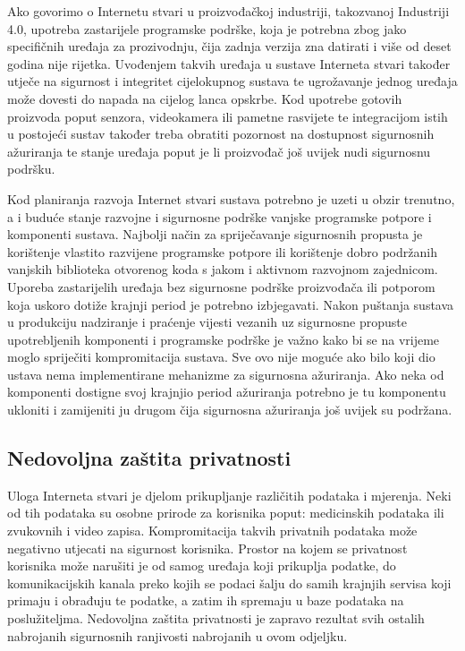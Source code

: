 \documentclass[times, utf8, diplomski]{fer}
\begin{document}
Ako govorimo o Internetu stvari u proizvođačkoj industriji, takozvanoj Industriji 4.0, upotreba zastarijele programske podrške, koja je potrebna zbog jako specifičnih uređaja za prozivodnju, čija zadnja verzija zna datirati i više od deset godina nije rijetka. Uvođenjem takvih uređaja u sustave Interneta stvari također utječe na sigurnost i integritet cijelokupnog sustava te ugrožavanje jednog uređaja može dovesti do napada na cijelog lanca opskrbe. Kod upotrebe gotovih proizvoda poput senzora, videokamera ili pametne rasvijete te integracijom istih u postojeći sustav također treba obratiti pozornost na dostupnost sigurnosnih ažuriranja te stanje uređaja poput je li proizvođač još uvijek nudi sigurnosnu podršku.

Kod planiranja razvoja Internet stvari sustava potrebno je uzeti u obzir trenutno, a i buduće stanje razvojne i sigurnosne podrške vanjske programske potpore i komponenti sustava. Najbolji način za spriječavanje sigurnosnih propusta je korištenje vlastito razvijene programske potpore ili korištenje dobro podržanih vanjskih biblioteka otvorenog koda s jakom i aktivnom razvojnom zajednicom. Uporeba zastarijelih uređaja bez sigurnosne podrške proizvođača ili potporom koja uskoro dotiže krajnji period  je potrebno izbjegavati. Nakon puštanja sustava u produkciju nadziranje i praćenje vijesti vezanih uz sigurnosne propuste upotrebljenih komponenti i programske podrške je važno kako bi se na vrijeme moglo spriječiti kompromitacija sustava. Sve ovo nije moguće ako bilo koji dio ustava nema implementirane mehanizme za sigurnosna ažuriranja. Ako neka od komponenti dostigne svoj krajnjio period ažuriranja potrebno je tu komponentu ukloniti i zamijeniti ju drugom čija sigurnosna ažuriranja još uvijek su podržana.  

\subsection{Nedovoljna zaštita privatnosti}
Uloga Interneta stvari je djelom prikupljanje različitih podataka i mjerenja. Neki od tih podataka su osobne prirode za korisnika poput: medicinskih podataka ili zvukovnih i video zapisa. Kompromitacija takvih privatnih podataka može negativno utjecati na sigurnost korisnika. Prostor na kojem se privatnost korisnika može narušiti je od samog uređaja koji prikuplja podatke, do komunikacijskih kanala preko kojih se podaci šalju do samih krajnjih servisa koji primaju i obrađuju te podatke, a zatim ih spremaju u baze podataka na poslužiteljma. Nedovoljna zaštita privatnosti je zapravo rezultat svih ostalih nabrojanih sigurnosnih ranjivosti nabrojanih u ovom odjeljku. 
\end{document}
